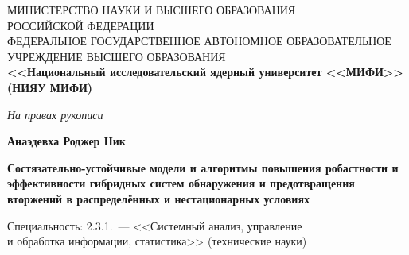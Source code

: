 
\begin{titlepage}
\thispagestyle{empty}
\begin{center}

{\small
МИНИСТЕРСТВО НАУКИ И ВЫСШЕГО ОБРАЗОВАНИЯ\\
РОССИЙСКОЙ ФЕДЕРАЦИИ\\
ФЕДЕРАЛЬНОЕ ГОСУДАРСТВЕННОЕ АВТОНОМНОЕ ОБРАЗОВАТЕЛЬНОЕ\\
УЧРЕЖДЕНИЕ ВЫСШЕГО ОБРАЗОВАНИЯ\\[2pt]
\textbf{<<Национальный исследовательский ядерный университет <<МИФИ>>}\\
\textbf{(НИЯУ МИФИ)}
}

\end{center}

\hfill
\begin{minipage}{0.45\textwidth}
\flushright
\itshape На правах рукописи
\end{minipage}

\vspace{2.0cm}

\begin{center}

{\large\textbf{Анаэдевха Роджер Ник}}

\vspace{1.6cm}

{\large\textbf{Состязательно-устойчивые модели и алгоритмы
повышения робастности и эффективности гибридных систем
обнаружения и предотвращения вторжений в распределённых
и нестационарных условиях}}

\vspace{2.0cm}

{\small
Специальность: 2.3.1.~--- <<Системный анализ, управление\\
и обработка информации, статистика>> (технические науки)
}

\vspace{1.5cm}


\end{center}
\end{titlepage}
